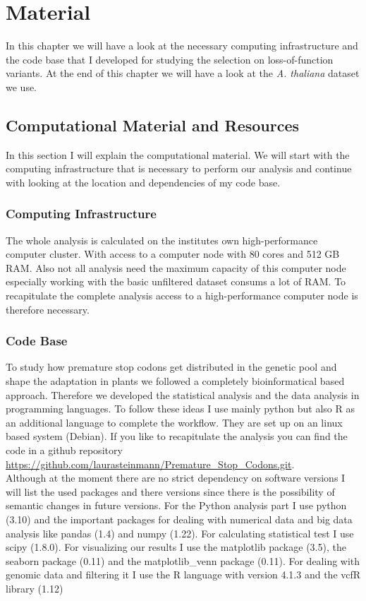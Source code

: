 \chapter{Material}
In this chapter we will have a look at the necessary computing infrastructure and the code base that I developed for studying the selection on loss-of-function variants. At the end of this chapter we will have a look at the \textit{A. thaliana} dataset we use.
\section{Computational Material and Resources}
In this section I will explain the computational material. We will start with the computing infrastructure that is necessary to perform our analysis and continue with looking at the location and dependencies of my code base.
\subsection{Computing Infrastructure}
The whole analysis is calculated on the institutes own high-performance computer cluster. With access to a computer node with 80 cores and 512 GB RAM. Also not all analysis need the maximum capacity of this computer node especially working with the basic unfiltered dataset consums a lot of RAM. To recapitulate the complete analysis access to a high-performance computer node is therefore necessary. 
\subsection{Code Base}
To study how premature stop codons get distributed in the genetic pool and shape the adaptation in plants we followed a completely bioinformatical based approach. Therefore we developed the statistical analysis and the data analysis in programming languages. To follow these ideas I use mainly python but also R as an additional language to complete the workflow. They are set up on an linux based system (Debian). If you like to recapitulate the analysis you can find the code in a github repository \url{https://github.com/laurasteinmann/Premature_Stop_Codons.git}.\\
Although at the moment there are no strict dependency on software versions I will list the used packages and there versions since there is the possibility of semantic changes in future versions. For the Python analysis part I use python (3.10) and the important packages for dealing with numerical data and big data analysis like pandas (1.4) and  numpy (1.22). For calculating statistical test I use scipy (1.8.0). For visualizing our results I use the matplotlib package (3.5), the seaborn package (0.11) and the matplotlib\_venn package (0.11). For dealing with genomic data and filtering it I use the R language with version 4.1.3 and the vcfR library (1.12)
